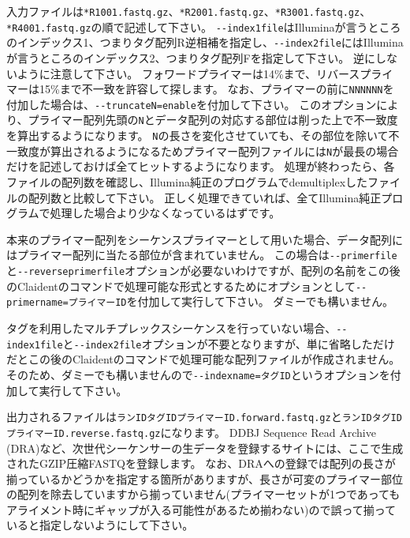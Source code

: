 \documentclass[titlepage,10pt,a4paper]{jsbook}
\begin{document}
入力ファイルは\texttt{*{\textunderscore}R1{\textunderscore}001.fastq.gz}、\texttt{*{\textunderscore}R2{\textunderscore}001.fastq.gz}、\texttt{*{\textunderscore}R3{\textunderscore}001.fastq.gz}、\texttt{*{\textunderscore}R4{\textunderscore}001.fastq.gz}の順で記述して下さい。
\texttt{{-}{-}index1file}はIlluminaが言うところのインデックス1、つまりタグ配列R逆相補を指定し、\texttt{{-}{-}index2file}にはIlluminaが言うところのインデックス2、つまりタグ配列Fを指定して下さい。
逆にしないように注意して下さい。
フォワードプライマーは14\%まで、リバースプライマーは15\%まで不一致を許容して探します。
なお、プライマーの前に\texttt{NNNNNN}を付加した場合は、\texttt{{-}{-}truncateN=enable}を付加して下さい。
このオプションにより、プライマー配列先頭の\texttt{N}とデータ配列の対応する部位は削った上で不一致度を算出するようになります。
\texttt{N}の長さを変化させていても、その部位を除いて不一致度が算出されるようになるためプライマー配列ファイルには\texttt{N}が最長の場合だけを記述しておけば全てヒットするようになります。
処理が終わったら、各ファイルの配列数を確認し、Illumina純正のプログラムでdemultiplexしたファイルの配列数と比較して下さい。
正しく処理できていれば、全てIllumina純正プログラムで処理した場合より少なくなっているはずです。

本来のプライマー配列をシーケンスプライマーとして用いた場合、データ配列にはプライマー配列に当たる部位が含まれていません。
この場合は\texttt{{-}{-}primerfile}と\texttt{{-}{-}reverseprimerfile}オプションが必要ないわけですが、配列の名前をこの後のClaidentのコマンドで処理可能な形式とするためにオプションとして\texttt{{-}{-}primername=プライマーID}を付加して実行して下さい。
ダミーでも構いません。

タグを利用したマルチプレックスシーケンスを行っていない場合、\texttt{{-}{-}index1file}と\texttt{{-}{-}index2file}オプションが不要となりますが、単に省略しただけだとこの後のClaidentのコマンドで処理可能な配列ファイルが作成されません。
そのため、ダミーでも構いませんので\texttt{{-}{-}indexname=タグID}というオプションを付加して実行して下さい。

出力されるファイルは\texttt{ランID{\textunderscore}{\textunderscore}タグID{\textunderscore}{\textunderscore}プライマーID.forward.fastq.gz}と\texttt{ランID{\textunderscore}{\textunderscore}タグID{\textunderscore}{\textunderscore}プライマーID.reverse.fastq.gz}になります。
DDBJ Sequence Read Archive (DRA)など、次世代シーケンサーの生データを登録するサイトには、ここで生成されたGZIP圧縮FASTQを登録します。
なお、DRAへの登録では配列の長さが揃っているかどうかを指定する箇所がありますが、長さが可変のプライマー部位の配列を除去していますから揃っていません(プライマーセットが1つであってもアライメント時にギャップが入る可能性があるため揃わない)ので誤って揃っていると指定しないようにして下さい。
\end{document}
